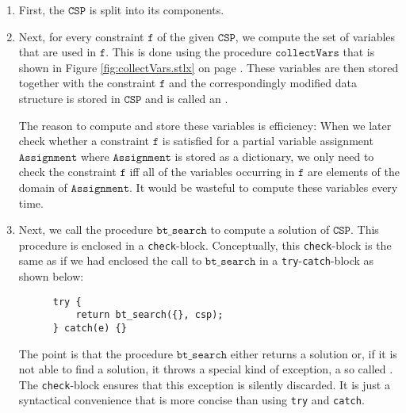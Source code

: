\begin{enumerate}
\item First, the $\texttt{CSP}$ is split into its components.
\item Next, for every constraint $\texttt{f}$ of the given $\texttt{CSP}$, we compute the set of variables that
      are used in $\texttt{f}$.  This is done using the procedure $\texttt{collectVars}$ that is shown in
      Figure \ref{fig:collectVars.stlx} on page \pageref{fig:collectVars.stlx}.
      These variables are then stored together with the constraint $\texttt{f}$ and
      the correspondingly modified data structure is stored in $\texttt{CSP}$ and is called an
      .

      The reason to compute and store these variables is efficiency: When we later check whether a constraint $\texttt{f}$
      is satisfied for a partial variable assignment $\texttt{Assignment}$ where $\texttt{Assignment}$ is
      stored as a dictionary, we only need to check the constraint $\texttt{f}$ iff all of the variables occurring
      in $\texttt{f}$ are elements of the domain of $\texttt{Assignment}$.   It would be wasteful to compute
      these variables every time.
\item Next, we call the procedure $\texttt{bt\_search}$ to compute a solution of $\texttt{CSP}$.
      This procedure is enclosed in a \texttt{check}-block.  Conceptually, this \texttt{check}-block is the
      same as if we had enclosed the call to $\texttt{bt\_search}$ in a \texttt{try}-\texttt{catch}-block as
      shown below:

\begin{verbatim}
      try {
          return bt_search({}, csp);
      } catch(e) {}
\end{verbatim}
     The point is that the procedure $\texttt{bt\_search}$ either returns a solution or, if it is not able to
     find a solution, it throws a special kind of exception, a so called .
     The \texttt{check}-block ensures that this exception is silently discarded.  It is just a syntactical
     convenience that is more concise than using \texttt{try} and \texttt{catch}.
\end{enumerate}

